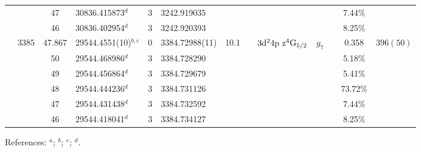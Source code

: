 \begin{table*}
\begin{center}
{\begin{tabular}{:l;l;c;l;c;l;c;l;l;c;c;c;c}
\rowstyle{\itshape}               &        & 47        & 30836.415873$^{d}$               & 3 &   3242.919035      &      & $                                        $ & $                                        $ & $      $ &              & 7.44\%    & $          $\\
\rowstyle{\itshape}               &        & 46        & 30836.402954$^{d}$               & 3 &   3242.920393      &      & $                                        $ & $                                        $ & $      $ &              & 8.25\%    & $          $\\
                                  & 3385   & 47.867    & 29544.4551(10)$^{b,c}$           & 0 &    3384.72988(11)  & 10.1 & $                                        $ & $3\rm{d}^24\rm{p~z}^4\rm{G}_{5/2}        $ & $g_{7} $ &              & 0.358     & $  396(50) $\\
\rowstyle{\itshape}               &        & 50        & 29544.468986$^{d}$               & 3 &   3384.728290      &      & $                                        $ & $                                        $ & $      $ &              & 5.18\%    & $          $\\
\rowstyle{\itshape}               &        & 49        & 29544.456864$^{d}$               & 3 &   3384.729679      &      & $                                        $ & $                                        $ & $      $ &              & 5.41\%    & $          $\\
\rowstyle{\itshape}               &        & 48        & 29544.444236$^{d}$               & 3 &   3384.731126      &      & $                                        $ & $                                        $ & $      $ &              & 73.72\%   & $          $\\
\rowstyle{\itshape}               &        & 47        & 29544.431438$^{d}$               & 3 &   3384.732592      &      & $                                        $ & $                                        $ & $      $ &              & 7.44\%    & $          $\\
\rowstyle{\itshape}               &        & 46        & 29544.418041$^{d}$               & 3 &   3384.734127      &      & $                                        $ & $                                        $ & $      $ &              & 8.25\%    & $          $\\
\hline
\end{tabular}
}
{\footnotesize References:
$^{a}$\citet{Ruffoni:2010:424};
$^{b}$\citet{Aldenius:2009:014008};
$^{c}$\citet{Nave:2012:1570};
$^{d}$\citet{Berengut:2008:235702}.}
\end{center}
\end{table*}

